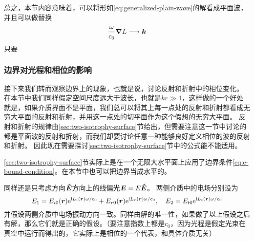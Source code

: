 总之，本节内容意味着，可以将形如\eqref{eq:generalized-plain-wave}的解看成平面波，并且可以做替换
\begin{equation}
    \frac{\omega}{c_0} \grad{L} \longrightarrow \vb*{k}
    \label{eq:generalized-k}
\end{equation}
只要

\subsubsection{边界对光程和相位的影响}

接下来我们转而观察边界上的现象，也就是说，讨论反射和折射中的相位变化。
在本节中我们同样假定空间尺度远大于波长，也就是$kr \gg 1$，这样做的一个好处就是，如果介质界面不是平面，我们总可以将其上每一点处的反射和折射都看成无穷大平面的反射和折射，并用这一点处的切平面作为这个假想的无穷大平面。
反射和折射的规律由\ref{sec:two-isotrophy-surface}节给出，但需要注意这一节中讨论的都是平面波的反射和折射，而我们却要讨论任意一种能够良好定义相位的波的反射和折射。
因此现在需要探讨\ref{sec:two-isotrophy-surface}节中的公式能不能适用。

\ref{sec:two-isotrophy-surface}节实际上是在一个无限大水平面上应用了边界条件\eqref{eq:e-bound-condition}。在本节中也可以把边界当成水平的。

同样还是只考虑方向$\vu*{E}$方向上的线偏光$\vb*{E} = E \vu*{E}$。
两侧介质中的电场分别设为
\[
    E_1 = E_{i0}(\vb*{r}) \mathrm{e}^{\mathrm{i} L_i(\vb*{r}) \omega / c_0} + E_{r0}(\vb*{r}) \mathrm{e}^{\mathrm{i} L_r(\vb*{r}) \omega / c_0}, \quad E_2 = E_{t0} \mathrm{e}^{\mathrm{i} L_t(\vb*{r}) \omega / c_0}
\]
并假设两侧介质中电场振动方向一致。同样由解的唯一性，如果做了以上假设之后有解，那么它们就是正确的假设。（要注意指数上都是$c_0$，因为光程是假定光束在真空中运行而得出的，它实际上是相位的一个代表，和具体介质无关）


